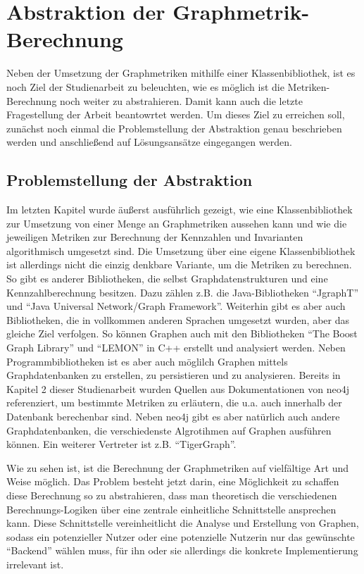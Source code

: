 \documentclass[a4paper,12pt,ngerman,chapterprefix=false,listof=totoc,bibliography=totoc]{scrreprt}
\begin{document}
{{\chapter{Abstraktion der Graphmetrik-Berechnung}
{
Neben der Umsetzung der Graphmetriken mithilfe einer Klassenbibliothek, ist es noch Ziel der Studienarbeit zu beleuchten, wie es möglich ist die Metriken-Berechnung noch weiter zu abstrahieren. Damit kann auch die letzte Fragestellung der Arbeit beantowrtet werden. Um dieses Ziel zu erreichen soll, zunächst noch einmal die Problemstellung der Abstraktion genau beschrieben werden und anschließend auf Lösungsansätze eingegangen werden.
}
\section{Problemstellung der Abstraktion}
{
Im letzten Kapitel wurde äußerst ausführlich gezeigt, wie eine Klassenbibliothek zur Umsetzung von einer Menge an Graphmetriken aussehen kann und wie die jeweiligen Metriken zur Berechnung der Kennzahlen und Invarianten algorithmisch umgesetzt sind. Die Umsetzung über eine eigene Klassenbibliothek ist allerdings nicht die einzig denkbare Variante, um die Metriken zu berechnen. So gibt es anderer Bibliotheken, die selbst Graphdatenstrukturen und eine Kennzahlberechnung besitzen. Dazu zählen z.B. die Java-Bibliotheken "`JgraphT"' und "`Java Universal Network/Graph Framework"'. Weiterhin gibt es aber auch Bibliotheken, die in vollkommen anderen Sprachen umgesetzt wurden, aber das gleiche Ziel verfolgen. So können Graphen auch mit den Bibliotheken "`The Boost Graph Library"' und "`LEMON"' in C++ erstellt und analysiert werden. Neben Programmbibliotheken ist es aber auch möglilch Graphen mittels Graphdatenbanken zu erstellen, zu persistieren und zu analysieren. Bereits in Kapitel 2 dieser Studienarbeit wurden Quellen aus Dokumentationen von neo4j referenziert, um bestimmte Metriken zu erläutern, die u.a. auch innerhalb der Datenbank berechenbar sind. Neben neo4j gibt es aber natürlich auch andere Graphdatenbanken, die verschiedenste Algrotihmen auf Graphen ausführen können. Ein weiterer Vertreter ist z.B. "`TigerGraph"'.

Wie zu sehen ist, ist die Berechnung der Graphmetriken auf vielfältige Art und Weise möglich. Das Problem besteht jetzt darin, eine Möglichkeit zu schaffen diese Berechnung so zu abstrahieren, dass man theoretisch die verschiedenen Berechnungs-Logiken über eine zentrale einheitliche Schnittstelle ansprechen kann. Diese Schnittstelle vereinheitlicht die Analyse und Erstellung von Graphen, sodass ein potenzieller Nutzer oder eine potenzielle Nutzerin nur das gewünschte "`Backend"' wählen muss, für ihn oder sie allerdings die konkrete Implementierung irrelevant ist.
}
}}
\end{document}
